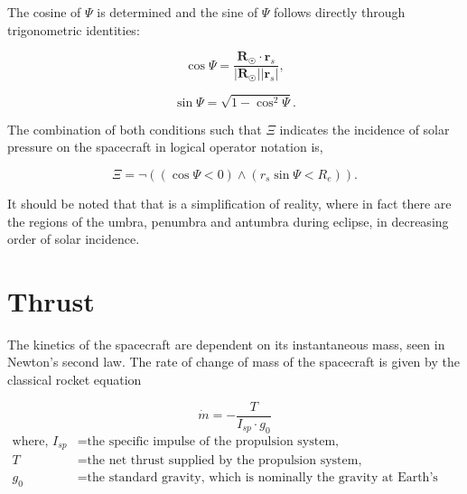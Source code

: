 The cosine of $\Psi$ is determined and the sine of $\Psi$ follows directly
through trigonometric identities:

\vspace{3mm}
\begin{minipage}{.5\linewidth}
    \begin{equation}
        \cos{\Psi} = \frac{\mathbf{R}_\Sun \cdot \mathbf{r}_s }{|\mathbf{R}_\Sun|| \mathbf{r}_s|},
    \end{equation}
\end{minipage}%
\begin{minipage}{.5\linewidth}
    \begin{equation}
        \sin{\Psi} = \sqrt{1-\cos^2{\Psi}}.
    \end{equation}
\end{minipage}
\vspace{1mm}

The combination of both conditions such that $\Xi$ indicates the incidence of
solar pressure on the spacecraft in logical operator notation is,

\begin{equation}
    \Xi=\lnot((\cos{\Psi}<0)\land(r_s\sin{\Psi}<R_e)).
\end{equation}

It should be noted that that is a simplification of reality, where in fact
there are the regions of the umbra, penumbra and antumbra during eclipse, in
decreasing order of solar incidence.

\section{Thrust}

The kinetics of the spacecraft are dependent on its instantaneous mass, seen in
Newton's second law. The rate of change of mass of the spacecraft is given by
the classical rocket equation

\begin{equation}
    \dot{m}=-\frac{T}{I_{sp}\cdot{g_0}}
\end{equation}
\begin{equation*}
    \begin{aligned}
        \textrm{where, }
        I_{sp} &= \textrm{the specific impulse of the propulsion system,}\\
        T &= \textrm{the net thrust supplied by the propulsion system,}\\
        g_0 &= \textrm{the standard gravity, which is nominally the gravity at Earth's surface.}
    \end{aligned}
\end{equation*}

